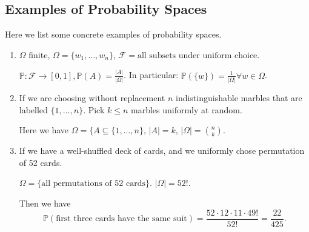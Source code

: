 \subsection{Examples of Probability Spaces}
\begin{example}
    Here we list some concrete examples of probability spaces.
    \begin{enumerate}
\item \(\Omega\) finite, \(\Omega = \{w_1, \ldots , w_n \}\), \(\mathcal{F} = \text{all subsets under uniform choice}\).

\(\mathbb{P}:\mathcal{F} \to [0,1], \mathbb{P}(A) = \frac{\left\vert A \right\vert }{\left\vert \Omega \right\vert }\).
In particular: \(\mathbb{P}(\{w\}) = \frac{1}{\left\vert \Omega \right\vert} \forall w \in \Omega\).

\item If we are choosing without replacement
\(n\) indistinguishable marbles that are labelled \(\{1, \ldots, n \}\). Pick \(k \leq n\) marbles uniformly at random.

Here we have \(\Omega=\{A \subseteq \{1, \ldots , n \}\), \(\left\vert A \right\vert = k\), \(\left\vert \Omega \right\vert = \binom{n}{k}\).

\item If we have a well-shuffled deck of cards, and we uniformly chose permutation of 52 cards.

\(\Omega = \{\text{all permutations of 52 cards}\}\). \(\left\vert \Omega \right\vert = 52!\).

Then we have
\[
    \mathbb{P}(\text{first three cards have the same suit}) = \frac{52 \cdot 12 \cdot 11 \cdot 49!}{52!} = \frac{22}{425}.
\]
    \end{enumerate}
\end{example}
